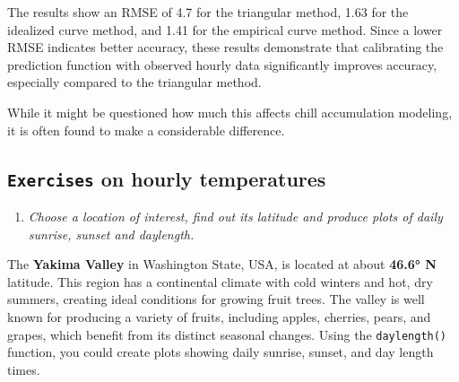 \documentclass[
]{article}
\providecommand{\tightlist}{%
  \setlength{\itemsep}{0pt}\setlength{\parskip}{0pt}}
\begin{document}
The results show an RMSE of 4.7 for the triangular method, 1.63 for the idealized curve method, and 1.41 for the empirical curve method. Since a lower RMSE indicates better accuracy, these results demonstrate that calibrating the prediction function with observed hourly data significantly improves accuracy, especially compared to the triangular method.

While it might be questioned how much this affects chill accumulation modeling, it is often found to make a considerable difference.

\subsection{\texorpdfstring{\texttt{Exercises} on hourly temperatures}{Exercises on hourly temperatures}}\label{exercises-on-hourly-temperatures}

\begin{enumerate}
\def\labelenumi{\arabic{enumi}.}
\tightlist
\item
  \emph{Choose a location of interest, find out its latitude and produce plots of daily sunrise, sunset and daylength.}
\end{enumerate}

The \textbf{Yakima Valley} in Washington State, USA, is located at about \textbf{46.6° N} latitude. This region has a continental climate with cold winters and hot, dry summers, creating ideal conditions for growing fruit trees. The valley is well known for producing a variety of fruits, including apples, cherries, pears, and grapes, which benefit from its distinct seasonal changes. Using the \texttt{daylength()} function, you could create plots showing daily sunrise, sunset, and day length times.
\end{document}

